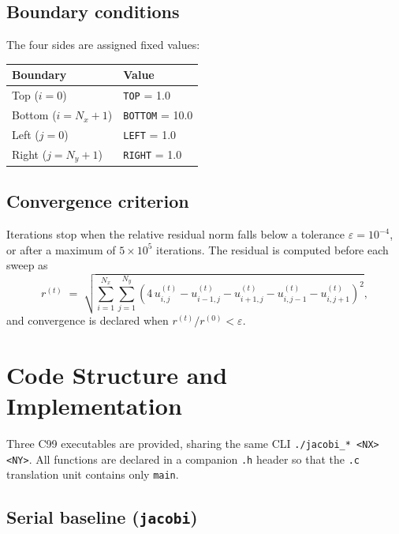 \documentclass[11pt,a4paper]{article}
\begin{document}
\subsection{Boundary conditions}

The four sides are assigned fixed values:
\begin{center}
\begin{tabular}{ll}
\toprule
Boundary & Value \\
\midrule
Top ($i=0$)         & \texttt{TOP}    = 1.0 \\
Bottom ($i=N_x+1$)  & \texttt{BOTTOM} = 10.0 \\
Left ($j=0$)        & \texttt{LEFT}   = 1.0 \\
Right ($j=N_y+1$)   & \texttt{RIGHT}  = 1.0 \\
\bottomrule
\end{tabular}
\end{center}

\subsection{Convergence criterion}

Iterations stop when the relative residual norm falls below a tolerance
$\varepsilon = 10^{-4}$, or after a maximum of $5\times10^5$ iterations.
The residual is computed before each sweep as
\begin{equation}
  r^{(t)}
  \;=\;
  \sqrt{
    \sum_{i=1}^{N_x}\sum_{j=1}^{N_y}
    \left( 4\,u^{(t)}_{i,j}
           - u^{(t)}_{i-1,j} - u^{(t)}_{i+1,j}
           - u^{(t)}_{i,j-1} - u^{(t)}_{i,j+1}
    \right)^2
  },
  \label{eq:residual}
\end{equation}
and convergence is declared when $r^{(t)}/r^{(0)} < \varepsilon$.

\section{Code Structure and Implementation}

Three C99 executables are provided, sharing the same CLI
\texttt{./jacobi{\_}* <NX> <NY>}.
All functions are declared in a companion \texttt{.h} header so that the
\texttt{.c} translation unit contains only \texttt{main}.

\subsection{Serial baseline (\texttt{jacobi})}
\end{document}
